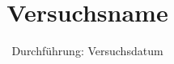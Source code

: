 


\subject{VXX}
\title{Versuchsname}
\date{
Durchführung: Versuchsdatum
}





\maketitle
\thispagestyle{empty}
\tableofcontents
\newpage


%




\printbibliography



